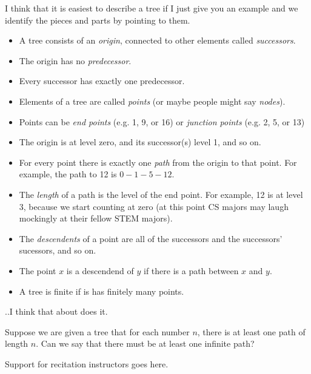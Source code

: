 \begin{definition}[Trees]I think that it is easiest to describe a tree if I just give you an example and we identify the pieces and parts by pointing to them.

\begin{itemize}
\item A tree consists of an \emph{origin}, connected to other elements called \emph{successors}.
\item The origin has no \emph{predecessor}.
\item Every successor has exactly one predecessor.
\item Elements of a tree are called \emph{points} (or maybe people might say \emph{nodes}).
\item Points can be \emph{end points} (e.g. 1, 9, or 16) or \emph{junction points} (e.g. 2, 5, or 13)
\item The origin is at level zero, and its successor(s) level 1, and so on.
\item For every point there is exactly one \emph{path} from the origin to that point.  For example, the path to 12 is $0-1-5-12$.
\item The \emph{length} of a path is the level of the end point. For example, 12 is at level 3, because we start counting at zero (at this point CS majors may laugh mockingly at their fellow STEM majors).
\item The \emph{descendents} of a point are all of the successors and the successors' sucessors, and so on.
\item The point $x$ is a descendend of $y$ if there is a path between $x$ and $y$.
\item A tree is finite if is has finitely many points.
\end{itemize}
..I think that about does it.
\end{definition}

\begin{problem}

 Suppose we are given a tree that for each number $n$, there is at least one path of length $n$.  Can we say that there must be at least one infinite path?

\ifKey
\hfill \begin{minipage}{0.5\textwidth}
\color{red} Support for recitation instructors goes here.
\end{minipage}
\color{black}
\fi

\end{problem}

